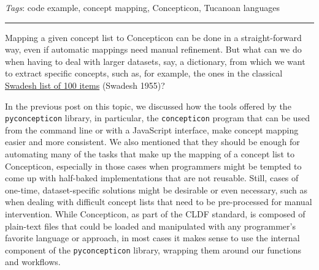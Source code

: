 \documentclass[
  a4paper,
  14pt,
  oneside,
  tablecaptionabove
]{scrbook}
\newcommand{\passthrough}[1]{#1}
\begin{document}
\emph{Tags}: code example, concept mapping, Concepticon, Tucanoan
languages

\begin{center}\rule{0.5\linewidth}{1pt}\end{center}

Mapping a given concept list to Concepticon can be done in a
straight-forward way, even if automatic mappings need manual refinement.
But what can we do when having to deal with larger datasets, say, a
dictionary, from which we want to extract specific concepts, such as,
for example, the ones in the classical
\href{https://concepticon.clld.org/contributions/Swadesh-1955-100}{Swadesh
list of 100 items} (Swadesh 1955)?

In the previous post on this topic, we discussed how the tools offered
by the \passthrough{\lstinline!pyconcepticon!} library, in particular,
the \passthrough{\lstinline!concepticon!} program that can be used from
the command line or with a JavaScript interface, make concept mapping
easier and more consistent. We also mentioned that they should be enough
for automating many of the tasks that make up the mapping of a concept
list to Concepticon, especially in those cases when programmers might be
tempted to come up with half-baked implementations that are not
reusable. Still, cases of one-time, dataset-specific solutions might be
desirable or even necessary, such as when dealing with difficult concept
lists that need to be pre-processed for manual intervention. While
Concepticon, as part of the CLDF standard, is composed of plain-text
files that could be loaded and manipulated with any programmer's
favorite language or approach, in most cases it makes sense to use the
internal component of the \passthrough{\lstinline!pyconcepticon!}
library, wrapping them around our functions and workflows.
\end{document}
